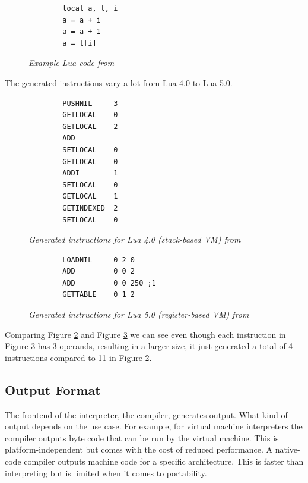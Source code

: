 \documentclass{article}
\begin{document}
\begin{figure}[ht]
    \begin{verbatim}
        local a, t, i
        a = a + i
        a = a + 1
        a = t[i]
    \end{verbatim}
    \caption{\textit{Example Lua code from ~\cite{lua_implementation}}}
    \label{fig:lua_code}
\end{figure}

The generated instructions vary a lot from Lua 4.0 to Lua 5.0.

\begin{figure}[ht]
    \begin{verbatim}
        PUSHNIL     3
        GETLOCAL    0
        GETLOCAL    2
        ADD
        SETLOCAL    0
        GETLOCAL    0
        ADDI        1
        SETLOCAL    0
        GETLOCAL    1
        GETINDEXED  2
        SETLOCAL    0
    \end{verbatim}
    \caption{\textit{Generated instructions for Lua 4.0 (stack-based VM) from ~\cite{lua_implementation}}}
    \label{fig:lua_generated4}
\end{figure}


\begin{figure}[ht]
    \begin{verbatim}
        LOADNIL     0 2 0
        ADD         0 0 2
        ADD         0 0 250 ;1
        GETTABLE    0 1 2
    \end{verbatim}
    \caption{\textit{Generated instructions for Lua 5.0 (register-based VM) from ~\cite{lua_implementation}}}
    \label{fig:lua_generated5}
\end{figure}

Comparing Figure \ref{fig:lua_generated4} and Figure \ref{fig:lua_generated5}
we can see even though each instruction in Figure \ref{fig:lua_generated5} has
3 operands, resulting in a larger size, it just generated a total of 4
instructions compared to 11 in Figure \ref{fig:lua_generated4}.

\subsection{Output Format}
The frontend of the interpreter, the compiler, generates output. What kind of
output depends on the use case. For example, for virtual machine interpreters
the compiler outputs byte code that can be run by the virtual machine. This is
platform-independent but comes with the cost of reduced performance. A
native-code compiler outputs machine code for a specific architecture. This is
faster than interpreting but is limited when it comes to portability.
~\cite{vmgen}
\end{document}
